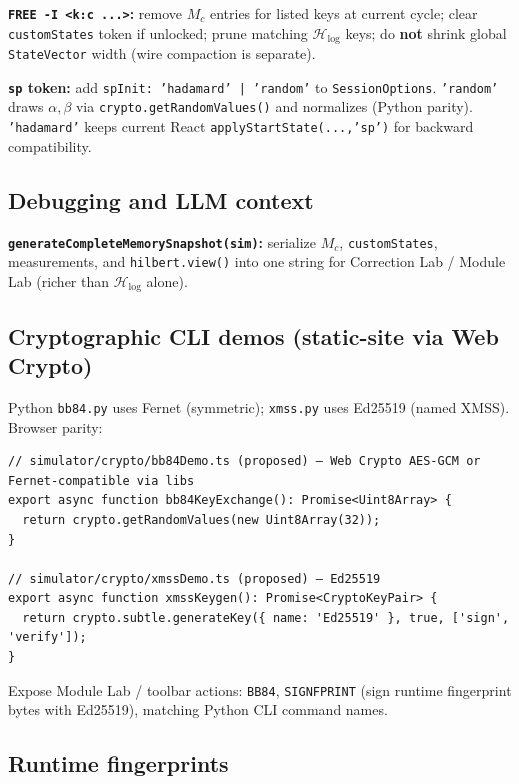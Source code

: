 \documentclass[11pt,a4paper]{article}
\newcommand{\HS}{\mathcal{H}_{\mathrm{log}}}
\begin{document}
\textbf{\texttt{FREE -I <k:c ...>}:} remove $M_c$ entries for listed keys at current cycle; clear \texttt{customStates} token if unlocked; prune matching $\HS$ keys; do \textbf{not} shrink global \texttt{StateVector} width (wire compaction is separate).

\textbf{\texttt{sp} token:} add \texttt{spInit: 'hadamard' | 'random'} to \texttt{SessionOptions}. \texttt{'random'} draws $\alpha,\beta$ via \texttt{crypto.getRandomValues()} and normalizes (Python parity). \texttt{'hadamard'} keeps current React \texttt{applyStartState(...,'sp')} for backward compatibility.

\subsection{Debugging and LLM context}

\textbf{\texttt{generateCompleteMemorySnapshot(sim)}:} serialize $M_c$, \texttt{customStates}, measurements, and \texttt{hilbert.view()} into one string for Correction Lab / Module Lab (richer than $\HS$ alone).

\subsection{Cryptographic CLI demos (static-site via Web Crypto)}

Python \texttt{bb84.py} uses Fernet (symmetric); \texttt{xmss.py} uses Ed25519 (named XMSS). Browser parity:

\begin{lstlisting}[style=code]
// simulator/crypto/bb84Demo.ts (proposed) — Web Crypto AES-GCM or Fernet-compatible via libs
export async function bb84KeyExchange(): Promise<Uint8Array> {
  return crypto.getRandomValues(new Uint8Array(32));
}

// simulator/crypto/xmssDemo.ts (proposed) — Ed25519
export async function xmssKeygen(): Promise<CryptoKeyPair> {
  return crypto.subtle.generateKey({ name: 'Ed25519' }, true, ['sign', 'verify']);
}
\end{lstlisting}

Expose Module Lab / toolbar actions: \texttt{BB84}, \texttt{SIGNFPRINT} (sign runtime fingerprint bytes with Ed25519), matching Python CLI command names.

\subsection{Runtime fingerprints}
\end{document}
